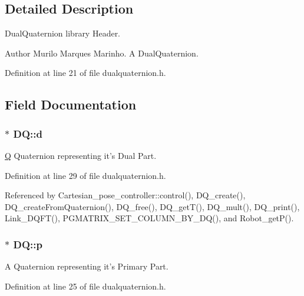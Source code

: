 \subsection{Detailed Description}
Dual\-Quaternion library Header. 

\begin{DoxyAuthor}{Author}
Murilo Marques Marinho. A Dual\-Quaternion. 
\end{DoxyAuthor}


Definition at line 21 of file dualquaternion.\-h.



\subsection{Field Documentation}
\hypertarget{structDQ_a535cdb52876521fd6abbfcf211a7c702}{
\subsubsection[{d}]{$\ast$ D\-Q\-::d}}\label{structDQ_a535cdb52876521fd6abbfcf211a7c702}


\hyperlink{structQ}{Q} Quaternion representing it's Dual Part. 



Definition at line 29 of file dualquaternion.\-h.



Referenced by Cartesian\-\_\-pose\-\_\-controller\-::control(), D\-Q\-\_\-create(), D\-Q\-\_\-create\-From\-Quaternion(), D\-Q\-\_\-free(), D\-Q\-\_\-get\-T(), D\-Q\-\_\-mult(), D\-Q\-\_\-print(), Link\-\_\-\-D\-Q\-F\-T(), P\-G\-M\-A\-T\-R\-I\-X\-\_\-\-S\-E\-T\-\_\-\-C\-O\-L\-U\-M\-N\-\_\-\-B\-Y\-\_\-\-D\-Q(), and Robot\-\_\-get\-P().

\hypertarget{structDQ_a878210bff170f4392d6cbe2d4704ffdc}{
\subsubsection[{p}]{$\ast$ D\-Q\-::p}}\label{structDQ_a878210bff170f4392d6cbe2d4704ffdc}


A Quaternion representing it's Primary Part. 



Definition at line 25 of file dualquaternion.\-h.



